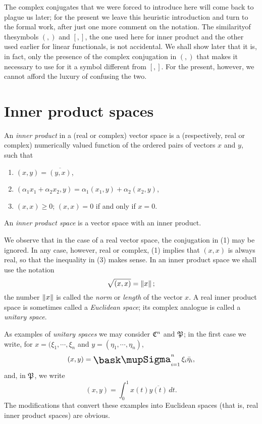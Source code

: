 The complex conjugates that we were forced to introduce here will come back to
plague us later; for the present we leave this heuristic introduction and turn
to the formal work, after just one more comment on the notation. The
similarityof thesymbols \((,)\) and \([,]\), the one used here for inner product
and the other used earlier for linear functionals, is not accidental. We shall
show later that it is, in fact, only the presence of the complex conjugation in
\((,)\) that makes it necessary to use for it a symbol different from \([,]\).
For the present, however, we cannot afford the luxury of confusing the two.

\section{Inner product spaces}

\begin{definition}
    An \emph{inner product} in a (real or complex) vector space is a (respectively, real or complex) numerically valued function of the ordered pairs of vectors \(x\) and \(y\), such that
    \begin{enumerate}
        \item \((x, y) = \overline{(y, x)}\), 
        \item \((\alpha_1 x_1 + \alpha_2 x_2, y) = \alpha_1(x_1, y) + \alpha_2(x_2, y)\),
        \item \((x, x) \geq 0\); \quad \((x, x) = 0\) if and only if \(x = 0\).
    \end{enumerate}
    An \emph{inner product space} is a vector space with an inner product.
\end{definition}


We observe that in the case of a real vector space, the conjugation in (1) may
be ignored. In any case, however, real or complex, (1) implies that \((x,x)\) is
always real, so that the inequality in (3) makes sense. In an inner product
space we shall use the notation
\begin{equation*}
    \sqrt{(x, x)} = \left\lVert x\right\rVert;
\end{equation*}
the number \(\left\lVert x\right\rVert\) is called the \emph{norm} or \emph{length} of the vector
\(x\). A real inner product space is sometimes called a \emph{Euclidean space};
its complex analogue is called a \emph{unitary space}.

As examples of \emph{unitary spaces} we may consider \(\frak{C}^n\) and
\(\frak{P}\); in the first case we write, for \(x = (\xi_1, \cdots, \xi_n\) and
\(y = (\eta_1, \cdots, \eta_n)\),
\begin{equation*}
    (x, y) = \textstyle\sumx_{i=1}^n \xi_i\bar{\eta}_i,
\end{equation*}
and, in \(\frak{P}\), we write
\begin{equation*}
    (x, y) = \displaystyle\int_{0}^1 x(t)\overline{y(t)}\, dt.
\end{equation*}
The modifications that convert these examples into Euclidean spaces (that is,
real inner product spaces) are obvious.

